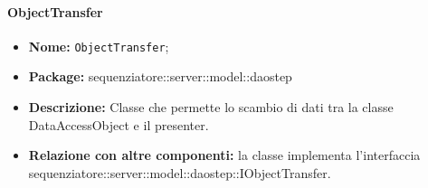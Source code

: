 \paragraph{ObjectTransfer}
	\begin{itemize}
		\item \textbf{Nome:} \texttt{ObjectTransfer};
		\item \textbf{Package:} sequenziatore::server::model::daostep
		\item \textbf{Descrizione:} Classe che permette lo scambio di dati tra la classe DataAccessObject e il presenter.
		\item \textbf{Relazione con altre componenti:} la classe implementa l'interfaccia sequenziatore::server::model::daostep::IObjectTransfer.
	\end{itemize}